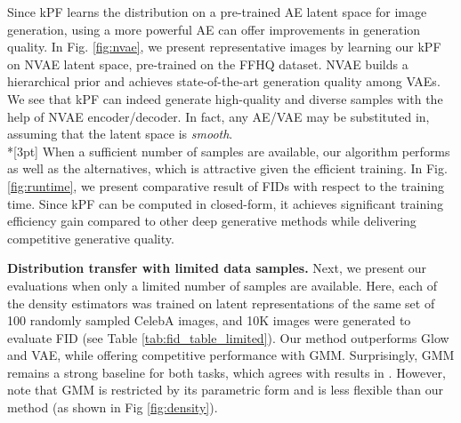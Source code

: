 
Since kPF learns the distribution on a pre-trained AE latent space for image generation, using a more powerful AE can 
offer improvements in generation quality. In Fig. \ref{fig:nvae}, we present representative images by learning 
our kPF on NVAE \cite{vahdat2020NVAE} latent space, pre-trained on the FFHQ dataset. NVAE builds a hierarchical prior and achieves state-of-the-art generation quality among VAEs. We see that kPF can indeed generate high-quality and diverse samples with the help of NVAE encoder/decoder. In fact, any AE/VAE may be substituted in, assuming that the latent space is \textit{smooth}.\\*[3pt]
%
 When a sufficient number of samples are available, our algorithm performs as well as the alternatives, which is attractive given the efficient training.  In Fig. \ref{fig:runtime}, we present comparative result of FIDs with respect to the training time. Since kPF can be computed in closed-form, it achieves significant training efficiency gain compared to other deep generative methods while delivering competitive generative quality.

\textbf{Distribution transfer with limited data samples.} Next, we present our evaluations when only a limited number of samples are available. Here, each of the density estimators was trained on latent representations of the same set of 100 randomly sampled CelebA images, and 10K images were generated to evaluate FID (see Table \ref{tab:fid_table_limited}).
Our method outperforms Glow and VAE, while offering competitive performance with GMM. Surprisingly, GMM remains a strong baseline for both tasks, which agrees with results in \citet{Ghosh2020From}. However, note that GMM is restricted by its parametric form and is less flexible than our method (as shown in Fig \ref{fig:density}).

